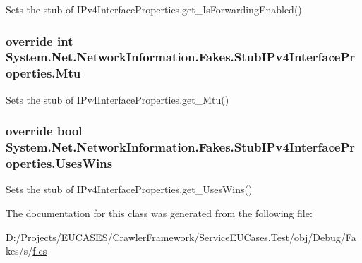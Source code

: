 Sets the stub of I\-Pv4\-Interface\-Properties.\-get\-\_\-\-Is\-Forwarding\-Enabled()

\hypertarget{class_system_1_1_net_1_1_network_information_1_1_fakes_1_1_stub_i_pv4_interface_properties_a459ba3946fe245f6b55eeb044c79dab8}{
\subsubsection[{Mtu}]{\setlength{\rightskip}{0pt plus 5cm}override int System.\-Net.\-Network\-Information.\-Fakes.\-Stub\-I\-Pv4\-Interface\-Properties.\-Mtu\hspace{0.3cm}{\ttfamily [get]}}}\label{class_system_1_1_net_1_1_network_information_1_1_fakes_1_1_stub_i_pv4_interface_properties_a459ba3946fe245f6b55eeb044c79dab8}


Sets the stub of I\-Pv4\-Interface\-Properties.\-get\-\_\-\-Mtu()

\hypertarget{class_system_1_1_net_1_1_network_information_1_1_fakes_1_1_stub_i_pv4_interface_properties_a1cef44b6b5b6794150960c6e50dd2d7a}{
\subsubsection[{Uses\-Wins}]{\setlength{\rightskip}{0pt plus 5cm}override bool System.\-Net.\-Network\-Information.\-Fakes.\-Stub\-I\-Pv4\-Interface\-Properties.\-Uses\-Wins\hspace{0.3cm}{\ttfamily [get]}}}\label{class_system_1_1_net_1_1_network_information_1_1_fakes_1_1_stub_i_pv4_interface_properties_a1cef44b6b5b6794150960c6e50dd2d7a}


Sets the stub of I\-Pv4\-Interface\-Properties.\-get\-\_\-\-Uses\-Wins()



The documentation for this class was generated from the following file\-:\begin{DoxyCompactItemize}
\item 
D\-:/\-Projects/\-E\-U\-C\-A\-S\-E\-S/\-Crawler\-Framework/\-Service\-E\-U\-Cases.\-Test/obj/\-Debug/\-Fakes/s/\hyperlink{s_2f_8cs}{f.\-cs}\end{DoxyCompactItemize}
